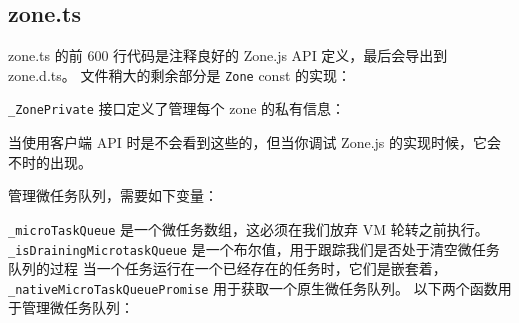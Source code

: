 \subsection{zone.ts}


zone.ts 的前 600 行代码是注释良好的 Zone.js API 定义，最后会导出到 zone.d.ts。
文件稍大的剩余部分是 \texttt{Zone} const 的实现：




\texttt{\_ZonePrivate} 接口定义了管理每个 zone 的私有信息：




当使用客户端 API 时是不会看到这些的，但当你调试 Zone.js 的实现时候，它会不时的出现。


管理微任务队列，需要如下变量：




\texttt{\_microTaskQueue} 是一个微任务数组，这必须在我们放弃 VM 轮转之前执行。
\texttt{\_isDrainingMicrotaskQueue} 是一个布尔值，用于跟踪我们是否处于清空微任务队列的过程
当一个任务运行在一个已经存在的任务时，它们是嵌套着，
\texttt{\_nativeMicroTaskQueuePromise} 用于获取一个原生微任务队列。
以下两个函数用于管理微任务队列：


